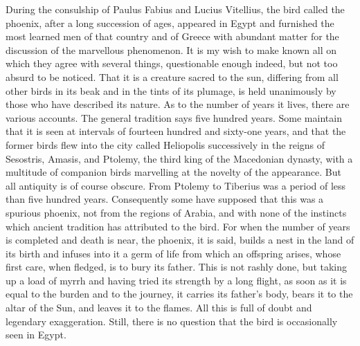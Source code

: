 During the consulship of Paulus Fabius and Lucius Vitellius, the bird called the phoenix, after a long succession of ages, appeared in Egypt and furnished the most learned men of that country and of Greece with abundant matter for the discussion of the marvellous phenomenon. It is my wish to make known all on which they agree with several things, questionable enough indeed, but not too absurd to be noticed. That it is a creature sacred to the sun, differing from all other birds in its beak and in the tints of its plumage, is held unanimously by those who have described its nature. As to the number of years it lives, there are various accounts. The general tradition says five hundred years. Some maintain that it is seen at intervals of fourteen hundred and sixty-one years, and that the former birds flew into the city called Heliopolis successively in the reigns of Sesostris, Amasis, and Ptolemy, the third king of the Macedonian dynasty, with a multitude of companion birds marvelling at the novelty of the appearance. But all antiquity is of course obscure. From Ptolemy to Tiberius was a period of less than five hundred years. Consequently some have supposed that this was a spurious phoenix, not from the regions of Arabia, and with none of the instincts which ancient tradition has attributed to the bird. For when the number of years is completed and death is near, the phoenix, it is said, builds a nest in the land of its birth and infuses into it a germ of life from which an offspring arises, whose first care, when fledged, is to bury its father. This is not rashly done, but taking up a load of myrrh and having tried its strength by a long flight, as soon as it is equal to the burden and to the journey, it carries its father's body, bears it to the altar of the Sun, and leaves it to the flames. All this is full of doubt and legendary exaggeration. Still, there is no question that the bird is occasionally seen in Egypt.


